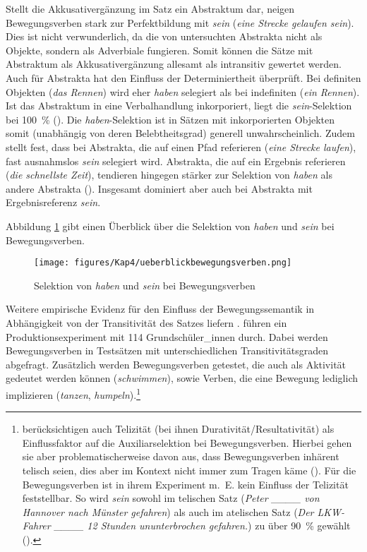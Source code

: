Stellt die Akkusativergänzung im Satz ein Abstraktum dar, neigen Bewegungsverben stark zur Perfektbildung mit \textit{sein} (\textit{eine Strecke gelaufen sein}). Dies ist nicht verwunderlich, da die von \textcite[291--292]{Gillmann.2016} untersuchten Abstrakta nicht als Objekte, sondern als Adverbiale fungieren. Somit können die Sätze mit Abstraktum als Akkusativergänzung allesamt als intransitiv gewertet werden. Auch für Abstrakta hat \textcite[292--295]{Gillmann.2016} den Einfluss der Determiniertheit überprüft. Bei definiten Objekten (\textit{das Rennen}) wird eher \textit{haben} selegiert als bei indefiniten (\textit{ein Rennen}). Ist das Abstraktum in eine Verbalhandlung inkorporiert, liegt die \textit{sein}-Selektion bei 100~\% (\cite[295]{Gillmann.2016}). Die \textit{haben}-Selektion ist in Sätzen mit inkorporierten Objekten somit  (unabhängig von deren Belebtheitsgrad) generell unwahrscheinlich. Zudem stellt \textcite[299--301]{Gillmann.2016} fest, dass bei Abstrakta, die auf einen Pfad referieren (\textit{eine Strecke laufen}), fast ausnahmslos \textit{sein} selegiert wird.   Abstrakta, die auf ein Ergebnis referieren (\textit{die schnellste Zeit}), tendieren hingegen stärker zur Selektion von \textit{haben} als andere Abstrakta (\cite[295--296]{Gillmann.2016}). Insgesamt dominiert aber auch bei Abstrakta mit Ergebnisreferenz \textit{sein}. 



Abbildung \ref{fig3bew} gibt einen Überblick über die Selektion von \textit{haben} und \textit{sein} bei Bewegungsverben.

\begin{figure}[!ht]
\texttt{[image: figures/Kap4/ueberblickbewegungsverben.png]}  
\caption{Selektion von \textit{haben} und \textit{sein} bei Bewegungsverben}
\label{fig3bew}
\end{figure} 

\begin{sloppypar}
Weitere empirische Evidenz für den Einfluss der Bewegungssemantik in Abhängigkeit von der Transitivität des Satzes liefern \textcite{Hinze.2007}. \textcite{Hinze.2007} führen ein Produktionsexperiment mit 114 Grund\-schü\-\mbox{ler\_in}\-nen durch. Dabei werden Bewegungsverben in Testsätzen mit unterschiedlichen Transitivitätsgraden abgefragt. Zusätzlich werden Bewegungsverben getestet, die auch als Aktivität gedeutet werden können (\textit{schwimmen}), sowie Verben, die eine Bewegung lediglich implizieren (\textit{tanzen}, \textit{humpeln}).\footnote{\textcite[102--103]{Hinze.2007} berücksichtigen auch Telizität (bei ihnen Durativität\slash Resultativität) als Einflussfaktor auf die Auxiliarselektion bei Bewegungsverben. Hierbei gehen sie aber problematischerweise davon aus, dass Bewegungsverben inhärent telisch seien, dies aber im Kontext nicht immer zum Tragen käme (\cite[102--103]{Hinze.2007}). Für die Bewegungsverben ist in ihrem Experiment m.~E.  kein Einfluss der Telizität feststellbar. So wird \textit{sein} sowohl im telischen Satz (\textit{Peter \_\_\_\_ von Hannover nach Münster gefahren}) als auch im atelischen Satz (\textit{Der LKW-Fahrer  \_\_\_\_ 12 Stunden ununterbrochen gefahren.}) zu über 90~\% gewählt (\cite[112]{Hinze.2007}).} 
\end{sloppypar}
 

